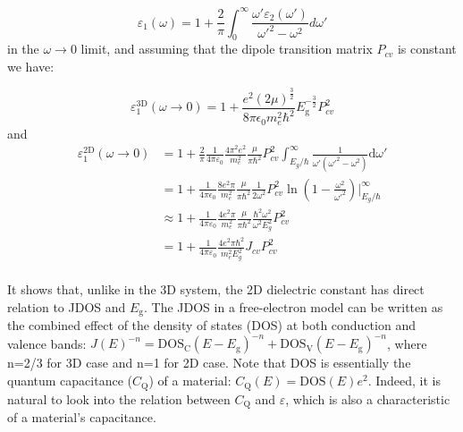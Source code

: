 \documentclass[journal=ancac3,manuscript=article,email=true,hyperref=true,keywords=true]{achemso}
\begin{document}
\begin{equation}
\label{eq:KKR}
\varepsilon_{1}(\omega) = 1 + \frac{2}{\pi} \int_{0}^{\infty}
                     \frac{\omega' \varepsilon_{2}(\omega')}{\omega'^{2} - \omega^{2}} d\omega'
\end{equation}
in the \(\omega \to 0\) limit, and assuming that the dipole transition
matrix $P_{cv}$ is constant we have:

\begin{equation}
\label{eq:eps1-3D}
\varepsilon_1^{\mathrm{3D}}(\omega \to 0) = 1 + \frac{e^2 (2 \mu) ^{\frac{3}{2}}}{8\pi \epsilon_0 m_{e}^{2} \hbar^{2}}E_{\mathrm{g}}^{-\frac{3}{2}}P_{cv}^{2}
\end{equation}
and
\begin{equation}
  \label{eq:Dressel-eps1}
  \begin{array}{lll}
  \varepsilon_{1}^{\mathrm{2D}}(\omega \to 0) &= \displaystyle 1 + \frac{2}{\pi} \frac{1}{4 \pi \varepsilon_{0}}
                         \frac{4 \pi^2  e^2}{m_{e}^{2}}
                         \frac{\mu}{\pi \hbar^2} P_{cv}^2
                         \int_{E_{g}/\hbar}^{\infty}
                      \frac{1}{\omega'(\omega'^{2} - \omega^{2})} \mathrm{d} \omega' \\
                    &= \displaystyle 1 + \frac{1}{4 \pi \epsilon_{0}} \frac{8 e^2 \pi}{m_{e}^{2}}
                      \frac{\mu}{\pi \hbar^{2}} \frac{1}{2 \omega^{2}} P_{cv}^{2}
                      \ln(1 - \frac{\omega^{2}}{\omega'^{2}}) \Big|_{E_{g}/\hbar}^{\infty} \\
                    &\approx \displaystyle 1 + \frac{1}{4 \pi \varepsilon_{0}}
                      \frac{4e^2 \pi}{m_{e}^2} \frac{\mu}{\pi \hbar^2}
                      \frac{\hbar^2 \omega^2}{\omega^2 E_{g}^2} P_{cv}^2\\
                    &= \displaystyle 1 + \frac{1}{4 \pi \varepsilon_{0}}
                      \frac{4 e^2 \pi \hbar^2}{m_e^2 E_g^2} J_{cv} P_{cv}^{2}
  \end{array}
\end{equation}
\\
It shows that, unlike in the 3D system, the 2D dielectric constant
has direct relation to JDOS and \(E_{\mathrm{g}}\). The JDOS in a free-electron model can be
written as the combined effect of the density of states (DOS) at both
conduction and valence bands: $J(E)^{-n} = \mathrm{DOS}_{\mathrm{C}}(E- E_{\mathrm{g}})^{-n} + \mathrm{DOS}_{\mathrm{V}}(E- E_{\mathrm{g}})^{-n}$, where n=2/3 for 3D case and n=1 for 2D case. 
Note that DOS is essentially the
quantum capacitance (\(C_{\mathrm{Q}}\)) of a material:
\(C_{\mathrm{Q}}(E) = \mathrm{DOS}(E) e^{2}\). Indeed, it is natural to look
into the relation between \(C_{\mathrm{Q}}\) and \(\varepsilon\), which is
also a characteristic of a material's capacitance. 
\end{document}
